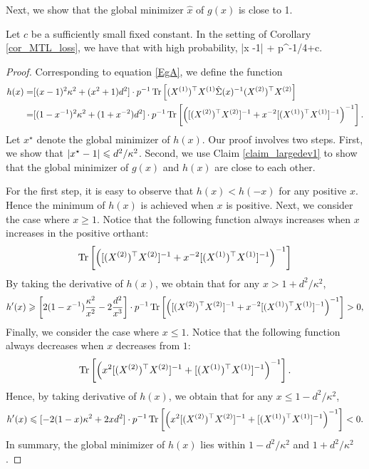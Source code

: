 Next, we show that the global minimizer $\hat x$ of $g(x)$ is close to 1.
\begin{claim}\label{lem_hat_v}
	Let $c$ be a sufficiently small fixed constant.
	In the setting of Corollary \ref{cor_MTL_loss}, we have that with high probability,
	\be\label{hatw_add1}|\hat x -1|\le  {} + p^{-1/4+c}.
	\ee
\end{claim}

\begin{proof}
Corresponding to equation \eqref{EgA}, we define the function
\begin{align*}
	h(x)  =& [(x-1)^2\kappa^2 + (x^2+1)d^2] \cdot p^{-1} \operatorname{Tr}\left[ (X^{(1)})^\top X^{(1)} \hat\Sigma(x)^{-1}(X^{(2)})^\top X^{(2)}\right] \\
				=& [(1-x^{-1})^2\kappa^2 + (1+x^{-2})d^2] \cdot p^{-1} \operatorname{Tr}\left[\left([(X^{(2)})^\top X^{(2)}]^{-1} + x^{-2} [(X^{(1)})^\top X^{(1)}]^{-1}\right)^{-1}\right].
\end{align*}
Let $x^{\star}$ denote the global minimizer of $h(x)$.
Our proof involves two steps.
First, we  show that $\left\lvert x^{\star} - 1\right\rvert \leqslant d^2 / \kappa^2$.
Second, we use Claim \ref{claim_largedev1} to show that the global minimizer of $g(x)$ and $h(x)$ are close to each other.

For the first step, it is easy to observe that $h(x)< h(-x)$ for any positive $x$.
Hence the minimum of $h(x)$ is achieved when $x$ is positive.
Next, we consider the case where $x\ge 1$.
Notice that the following function always increases when $x$ increases in the positive orthant:
$$\operatorname{Tr}\left[\left([(X^{(2)})^\top X^{(2)}]^{-1} + x^{-2} [(X^{(1)})^\top X^{(1)}]^{-1}\right)^{-1}\right]$$
By taking the derivative of $h(x)$, we obtain that for any $x > 1+d^2/\kappa^2$,
\begin{align}\label{h'(A)1}
h'(x) \geqslant \left[2(1-x^{-1})\frac{\kappa^2}{x^2} - 2\frac{d^2}{x^3}\right] \cdot p^{-1} \operatorname{Tr}\left[\left([(X^{(2)})^\top X^{(2)}]^{-1} + x^{-2} [(X^{(1)})^\top X^{(1)}]^{-1}\right)^{-1}\right] > 0,
\end{align}
Finally, we consider the case where $x \le 1$. Notice that the following function always decreases when $x$ decreases from $1$:
$$\operatorname{Tr}\left[\left(x^2[(X^{(2)})^\top X^{(2)}]^{-1} +  [(X^{(1)})^\top X^{(1)}]^{-1}\right)^{-1}\right].$$
Hence, by taking derivative of $h(x)$, we obtain that for any $x\le 1-d^2/\kappa^2$,
\begin{align}\label{h'(A)2}
	h'(x)\leqslant [-2(1-x)\kappa^2 +2 xd^2] \cdot p^{-1} \operatorname{Tr}\left[\left(x^2[(X^{(2)})^\top X^{(2)}]^{-1} + [(X^{(1)})^\top X^{(1)}]^{-1}\right)^{-1}\right] < 0.
\end{align}
In summary, the global minimizer of $h(x)$ lies within $1-d^2/\kappa^2$ and $1+d^2/\kappa^2$.






\end{proof}
